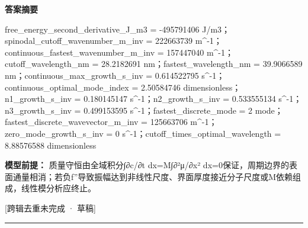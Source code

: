 \documentclass[UTF8,11pt,a4paper]{ctexart}
\begin{document}
\noindent\textbf{答案摘要}\par
free\_energy\_second\_derivative\_J\_m3 = -495791406 J/m3；spinodal\_cutoff\_wavenumber\_m\_inv = 222663739 m\textasciicircum{}-1；continuous\_fastest\_wavenumber\_m\_inv = 157447040 m\textasciicircum{}-1；cutoff\_wavelength\_nm = 28.2182691 nm；fastest\_wavelength\_nm = 39.9066589 nm；continuous\_max\_growth\_s\_inv = 0.614522795 s\textasciicircum{}-1；continuous\_optimal\_mode\_index = 2.50584746 dimensionless；n1\_growth\_s\_inv = 0.180145147 s\textasciicircum{}-1；n2\_growth\_s\_inv = 0.533555134 s\textasciicircum{}-1；n3\_growth\_s\_inv = 0.499153595 s\textasciicircum{}-1；fastest\_discrete\_mode = 2 mode；fastest\_discrete\_wavevector\_m\_inv = 125663706 m\textasciicircum{}-1；zero\_mode\_growth\_s\_inv = 0 s\textasciicircum{}-1；cutoff\_times\_optimal\_wavelength = 8.88576588 dimensionless\par
\noindent\textbf{模型前提：}
质量守恒由全域积分∫∂c/∂t dx=M∫∂²μ/∂x² dx=0保证，周期边界的表面通量相消；若负f''导致振幅达到非线性尺度、界面厚度接近分子尺度或M依赖组成，线性模分析应终止。\par
\noindent\textcolor{red!65!black}{[跨辑去重未完成 · 草稿]} \par
\medskip\hrule\medskip
{}
\end{document}
